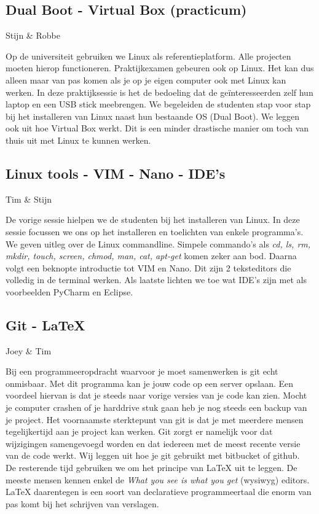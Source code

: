 \documentclass[a4paper]{article}
\begin{document}
		\subsection{Dual Boot - Virtual Box (practicum)}
			\begin{flushright}
				Stijn \& Robbe
			\end{flushright}
			Op de universiteit gebruiken we Linux als referentieplatform. Alle projecten moeten hierop functioneren. Praktijkexamen gebeuren ook op Linux. Het kan dus alleen maar van pas komen als je op je eigen computer ook met Linux kan werken. In deze praktijksessie is het de bedoeling dat de ge\"interesseerden zelf hun laptop en een USB stick meebrengen. We begeleiden de studenten stap voor stap bij het installeren van Linux naast hun bestaande OS (Dual Boot). We leggen ook uit hoe Virtual Box werkt. Dit is een minder drastische manier om toch van thuis uit met Linux te kunnen werken.
			
		\subsection{Linux tools - VIM - Nano - IDE's}
			\begin{flushright}
				Tim \& Stijn
			\end{flushright}
			De vorige sessie hielpen we de studenten bij het installeren van Linux. In deze sessie focussen we ons op het installeren en toelichten van enkele programma's. We geven uitleg over de Linux commandline. Simpele commando's als \emph{cd, ls, rm, mkdir, touch, screen, chmod, man, cat, apt-get} komen zeker aan bod. Daarna volgt een beknopte introductie tot VIM en Nano. Dit zijn 2 teksteditors die volledig in de terminal werken. Als laatste lichten we toe wat IDE's zijn met als voorbeelden PyCharm en Eclipse.
						
		\subsection{Git - LaTeX}
			\begin{flushright}
				Joey \& Tim
			\end{flushright}
			Bij een programmeeropdracht waarvoor je moet samenwerken is git echt onmisbaar. Met dit programma kan je jouw code op een server opslaan. Een voordeel hiervan is dat je steeds naar vorige versies van je code kan zien. Mocht je computer crashen of je harddrive stuk gaan heb je nog steeds een backup van je project. Het voornaamste sterktepunt van git is dat je met meerdere mensen tegelijkertijd aan je project kan werken. Git zorgt er namelijk voor dat wijzigingen samengevoegd worden en dat iedereen met de meest recente versie van de code werkt. Wij leggen uit hoe je git gebruikt met bitbucket of github. \\
			De resterende tijd gebruiken we om het principe van LaTeX uit te leggen. De meeste mensen kennen enkel de \emph{What you see is what you get} (wysiwyg) editors. LaTeX daarentegen is een soort van declaratieve programmeertaal die enorm van pas komt bij het schrijven van verslagen.
		
\end{document}
